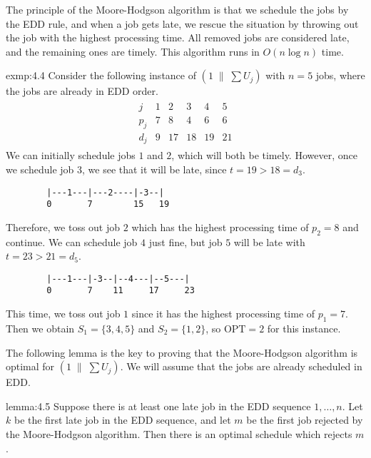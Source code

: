 The principle of the Moore-Hodgson algorithm is that we schedule the jobs by the EDD 
rule, and when a job gets late, we rescue the situation by throwing out the job with 
the highest processing time. All removed jobs are considered late, and the remaining 
ones are timely. This algorithm runs in $O(n\log n)$ time. 

\begin{exmp}{exmp:4.4}
    Consider the following instance of $(1 \;\|\; \sum U_j)$ with $n = 5$ jobs, 
    where the jobs are already in EDD order.  
    \begin{align*}
        \begin{array}{c|ccccc}
            j   & 1 & 2  & 3  & 4  & 5 \\ \hline 
            p_j & 7 & 8  & 4  & 6  & 6 \\ 
            d_j & 9 & 17 & 18 & 19 & 21
        \end{array}
    \end{align*}
    We can initially schedule jobs $1$ and $2$, which will both be timely. However, 
    once we schedule job $3$, we see that it will be late, since $t = 19 > 18 = d_3$.
    \begin{verbatim}
        |---1---|---2----|-3--|
        0       7        15   19
    \end{verbatim}
    \vspace{-1em}
    Therefore, we toss out job $2$ which has the highest processing time of $p_2 = 8$
    and continue. We can schedule job $4$ just fine, but job $5$ will be late with 
    $t = 23 > 21 = d_5$. 
    \begin{verbatim}
        |---1---|-3--|--4---|--5---|
        0       7    11     17     23
    \end{verbatim}
    \vspace{-1em}
    This time, we toss out job $1$ since it has the highest processing time of $p_1 = 7$. 
    Then we obtain $S_1 = \{3, 4, 5\}$ and $S_2 = \{1, 2\}$, so $\text{OPT} = 2$ for 
    this instance. 
\end{exmp}

The following lemma is the key to proving that the Moore-Hodgson algorithm is 
optimal for $(1\;\|\;\sum U_j)$. We will assume that the jobs are already scheduled 
in EDD. 

\begin{lemma}{lemma:4.5}
    Suppose there is at least one late job in the EDD sequence $1, \dots, n$. 
    Let $k$ be the first late job in the EDD sequence, and let $m$ be the first 
    job rejected by the Moore-Hodgson algorithm. Then there is an optimal 
    schedule which rejects $m$. 
\end{lemma}
\begin{pf}
\end{pf}
 